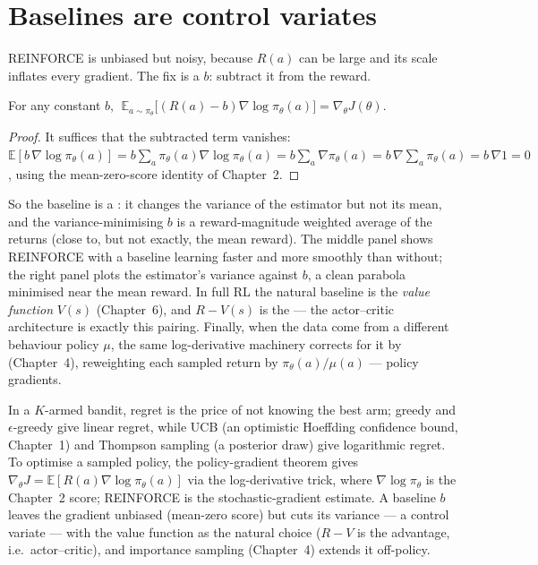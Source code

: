 \documentclass[11pt]{article}
\begin{document}
\section{Baselines are control variates}

REINFORCE is unbiased but noisy, because $R(a)$ can be large and its scale inflates
every gradient. The fix is a  $b$: subtract it from the reward.

\begin{theorem}
For any constant $b$, $\;\mathbb{E}_{a\sim\pi_\theta}\!\big[(R(a)-b)\nabla\log\pi_\theta(a)\big]
= \nabla_\theta J(\theta)$.
\end{theorem}
\begin{proof}
It suffices that the subtracted term vanishes:
$\mathbb{E}[b\,\nabla\log\pi_\theta(a)] = b\sum_a \pi_\theta(a)\nabla\log\pi_\theta(a)
= b\sum_a \nabla\pi_\theta(a) = b\,\nabla\!\sum_a\pi_\theta(a) = b\,\nabla 1 = 0$,
using the mean-zero-score identity of Chapter~2.
\end{proof}

So the baseline is a : it changes the variance of the
estimator but not its mean, and the variance-minimising $b$ is a reward-magnitude
weighted average of the returns (close to, but not exactly, the mean reward). The
middle panel shows REINFORCE with a baseline learning faster and more smoothly
than without; the right panel plots the estimator's variance against $b$, a clean
parabola minimised near the mean reward. In full RL the natural baseline is the
\emph{value function} $V(s)$ (Chapter~6), and $R-V(s)$ is the 
--- the actor--critic architecture is exactly this pairing. Finally, when the data
come from a different behaviour policy $\mu$, the same log-derivative machinery
corrects for it by  (Chapter~4), reweighting each
sampled return by $\pi_\theta(a)/\mu(a)$ ---  policy
gradients.

\begin{summarybox}
In a $K$-armed bandit, regret is the price of not knowing the best arm; greedy
and $\epsilon$-greedy give linear regret, while UCB (an optimistic Hoeffding
confidence bound, Chapter~1) and Thompson sampling (a posterior draw) give
logarithmic regret. To optimise a sampled policy, the policy-gradient theorem
gives $\nabla_\theta J = \mathbb{E}[R(a)\nabla\log\pi_\theta(a)]$ via the
log-derivative trick, where $\nabla\log\pi_\theta$ is the Chapter~2 score;
REINFORCE is the stochastic-gradient estimate. A baseline $b$ leaves the gradient
unbiased (mean-zero score) but cuts its variance --- a control variate --- with
the value function as the natural choice ($R-V$ is the advantage, i.e.\
actor--critic), and importance sampling (Chapter~4) extends it off-policy.
\end{summarybox}
\end{document}
